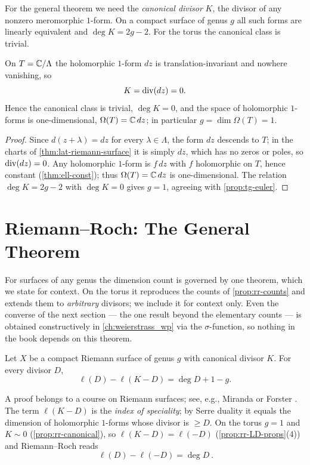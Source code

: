 For the general theorem we need the \emph{canonical divisor} \(K\), the divisor of
any nonzero meromorphic \(1\)-form. On a compact surface of genus \(g\) all such
forms are linearly equivalent and \(\deg K = 2g - 2\). For the torus the canonical
class is trivial.

\begin{proposition}
\label{prop:rr-canonical}
On \(T = \mathbb{C}/\Lambda\) the holomorphic \(1\)-form \(dz\) is translation-invariant
and nowhere vanishing, so
\[
  K = \operatorname{div}(dz) = 0 .
\]
Hence the canonical class is trivial, \(\deg K = 0\), and the space of
holomorphic \(1\)-forms is one-dimensional, \(\Omega(T) = \mathbb{C}\,dz\); in particular
\(g = \dim\Omega(T) = 1\).
\end{proposition}

\begin{proof}
Since \(d(z+\lambda) = dz\) for every \(\lambda \in \Lambda\), the form \(dz\)
descends to \(T\); in the charts of \cref{thm:lat-riemann-surface} it is simply
\(dz\), which has no zeros or poles, so \(\operatorname{div}(dz) = 0\). Any holomorphic
\(1\)-form is \(f\,dz\) with \(f\) holomorphic on \(T\), hence constant
(\cref{thm:ell-const}); thus \(\Omega(T) = \mathbb{C}\,dz\) is one-dimensional. The
relation \(\deg K = 2g - 2\) with \(\deg K = 0\) gives \(g = 1\), agreeing with
\cref{prop:tg-euler}.
\end{proof}

\section{Riemann--Roch: The General Theorem}
\label{sec:rr-theorem}

For surfaces of any genus the dimension count is governed by one theorem, which we
state for context. On the torus it reproduces the counts of \cref{prop:rr-counts}
and extends them to \emph{arbitrary} divisors; we include it for context only.
Even the converse of the next section --- the one result beyond the elementary
counts --- is obtained constructively in \cref{ch:weierstrass_wp} via the
\(\sigma\)-function, so nothing in the book depends on this theorem.

\begin{theorem}
\label{thm:rr}
Let \(X\) be a compact Riemann surface of genus \(g\) with canonical divisor
\(K\). For every divisor \(D\),
\[
  \ell(D) - \ell(K - D) = \deg D + 1 - g .
\]
\end{theorem}

A proof belongs to a course on Riemann surfaces; see, e.g., Miranda
\cite{miranda} or Forster \cite{forster}. The term \(\ell(K-D)\) is the
\emph{index of speciality}; by
Serre duality it equals the dimension of holomorphic \(1\)-forms whose divisor is
\(\ge D\). On the torus \(g = 1\) and \(K \sim 0\) (\cref{prop:rr-canonical}), so
\(\ell(K - D) = \ell(-D)\) (\cref{prop:rr-LD-props}(4)) and Riemann--Roch reads
\[
  \boxed{\ \ell(D) - \ell(-D) = \deg D\ } .
\]

